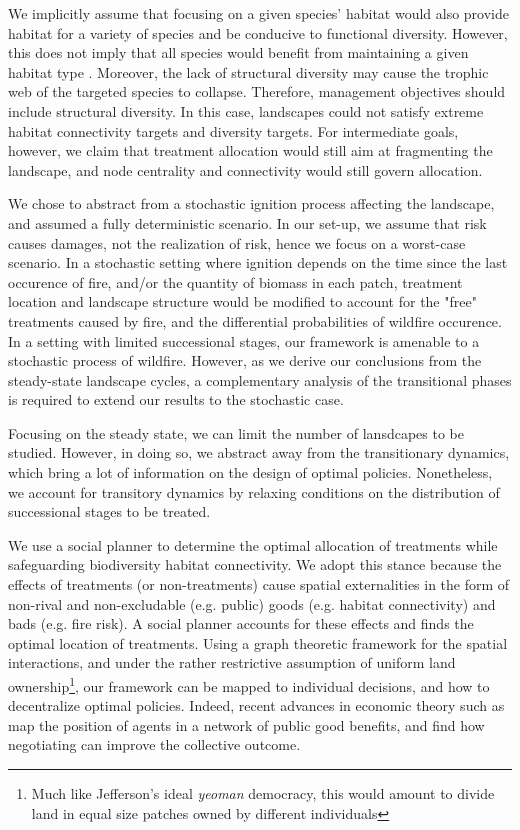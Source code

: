 We implicitly assume that focusing on a given species' habitat would also provide habitat for a variety of species and be conducive to functional diversity. However, this does not imply that all species would benefit from maintaining a given habitat type \citep{saab_short-term_2022}. Moreover, the lack of structural diversity may cause the trophic web of the targeted species to collapse. Therefore, management objectives should include structural diversity. In this case, landscapes could not satisfy extreme habitat connectivity targets and diversity targets. For intermediate goals, however, we claim that treatment allocation would still aim at fragmenting the landscape, and node centrality and connectivity would still govern allocation. 

We chose to abstract from a stochastic ignition process affecting the landscape, and assumed a fully deterministic scenario. In our set-up, we assume that risk causes damages, not the realization of risk, hence we focus on a worst-case scenario. In a stochastic setting where ignition depends on the time since the last occurence of fire, and/or the quantity of biomass in each patch, treatment location and landscape structure would be modified to account for the "free" treatments caused by fire, and the differential probabilities of wildfire occurence. In a setting with limited successional stages, our framework is amenable to a stochastic process of wildfire. However, as we derive our conclusions from the steady-state landscape cycles, a complementary analysis of the transitional phases is required to extend our results to the stochastic case. 

Focusing on the steady state, we can limit the number of lansdcapes to be studied. However, in doing so, we abstract away from the transitionary dynamics, which bring a lot of information on the design of optimal policies. Nonetheless, we account for transitory dynamics by relaxing conditions on the distribution of successional stages to be treated. 

We use a social planner to determine the optimal allocation of treatments while safeguarding biodiversity habitat connectivity. We adopt this stance because the effects of treatments (or non-treatments) cause spatial externalities in the form of non-rival and non-excludable (e.g. public) goods (e.g. habitat connectivity) and bads (e.g. fire risk). A social planner accounts for these effects and finds the optimal location of treatments. Using a graph theoretic framework for the spatial interactions, and under the rather restrictive assumption of uniform land ownership\footnote{Much like Jefferson's ideal \textit{yeoman} democracy, this would amount to divide land in equal size patches owned by different individuals}, our framework can be mapped to individual decisions, and how to decentralize optimal policies. Indeed, recent advances in economic theory such as \cite{elliott_network_2019} map the position of agents in a network of public good benefits, and find how negotiating can improve the collective outcome.

